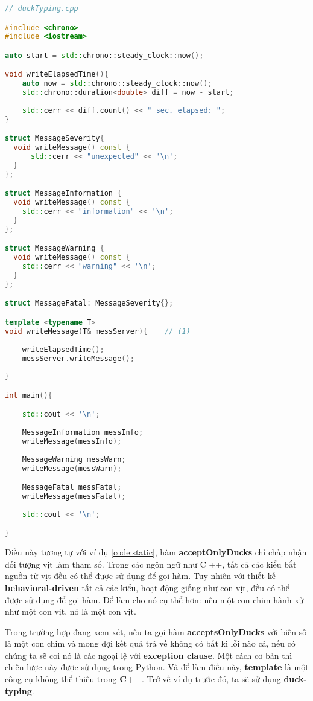 \begin{lstlisting}[caption={Dynamic polymophism \cite{poly}},label={code:static},language=C++]
// duckTyping.cpp

#include <chrono>
#include <iostream>

auto start = std::chrono::steady_clock::now();

void writeElapsedTime(){
    auto now = std::chrono::steady_clock::now();
    std::chrono::duration<double> diff = now - start;
  
    std::cerr << diff.count() << " sec. elapsed: ";
}

struct MessageSeverity{
  void writeMessage() const {
      std::cerr << "unexpected" << '\n';
  }
};

struct MessageInformation {
  void writeMessage() const {              
    std::cerr << "information" << '\n';
  }
};

struct MessageWarning {
  void writeMessage() const {               
    std::cerr << "warning" << '\n';
  }
};

struct MessageFatal: MessageSeverity{};     

template <typename T>
void writeMessage(T& messServer){    // (1)                   
	
	writeElapsedTime();                                   
	messServer.writeMessage();                            
	
}

int main(){

    std::cout << '\n';
  
    MessageInformation messInfo;
    writeMessage(messInfo);
    
    MessageWarning messWarn;
    writeMessage(messWarn);

    MessageFatal messFatal;
    writeMessage(messFatal);
  
    std::cout << '\n';

}

\end{lstlisting}
Điều này tương tự với ví dụ \ref{code:static}, hàm \textbf{acceptOnlyDucks} chỉ chấp nhận đối tượng vịt làm tham số. Trong các ngôn ngữ như C ++, tất cả các kiểu bắt nguồn từ vịt đều có thể được sử dụng để gọi hàm. Tuy nhiên với thiết kế \textbf{behavioral-driven} tất cả các kiểu, hoạt động giống như con vịt, đều có thể được sử dụng để gọi hàm. Để làm cho nó cụ thể hơn: nếu một con chim hành xử như một con vịt, nó là một con vịt.

Trong trường hợp đang xem xét, nếu ta gọi hàm \textbf{acceptsOnlyDucks} với biến số là một con chim và mong đợi kết quả trả về không có bất kì lỗi nào cả, nếu có chúng ta sẽ coi nó là các ngoại lệ với \textbf{exception clause}. Một cách cơ bản thì chiến lược này được sử dụng trong Python. Và để làm điều này, \textbf{template} là một công cụ không thể thiếu trong \textbf{C++}. Trở về ví dụ trước đó, ta sẽ sử dụng \textbf{duck-typing}.

